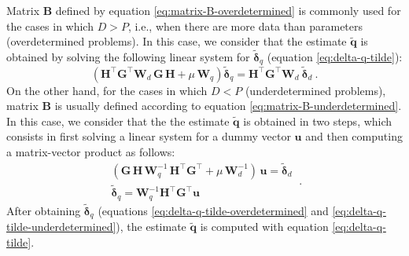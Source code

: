 Matrix $\mathbf{B}$ defined by equation \ref{eq:matrix-B-overdetermined} is commonly used for the cases in which $D > P$, i.e., when
there are more data than parameters (overdetermined problems).
In this case, we consider that the estimate $\tilde{\mathbf{q}}$ is obtained by solving the following linear system
for $\tilde{\boldsymbol{\delta}}_{q}$ (equation \ref{eq:delta-q-tilde}):
\begin{equation}
	\left( \mathbf{H}^{\top} \mathbf{G}^{\top} \mathbf{W}_{d} \, \mathbf{G} \, \mathbf{H} + 
	\mu \, \mathbf{W}_{q} \right) 
	\tilde{\boldsymbol{\delta}}_{q} = 
	\mathbf{H}^{\top} \mathbf{G}^{\top} \mathbf{W}_{d} \: 
	\tilde{\boldsymbol{\delta}}_{d} \: .
	\label{eq:delta-q-tilde-overdetermined}
\end{equation}
On the other hand, for the cases in which $D < P$ (underdetermined problems), matrix $\mathbf{B}$ is 
usually defined according to equation \ref{eq:matrix-B-underdetermined}. In this case, we consider that the 
the estimate $\tilde{\mathbf{q}}$ is obtained in two steps, which consists in first solving a linear system 
for a dummy vector $\mathbf{u}$ and then computing a matrix-vector product as follows:
\begin{equation}
	\begin{split}
		\left( \mathbf{G} \, \mathbf{H} \, \mathbf{W}_{q}^{-1} \,
		\mathbf{H}^{\top}\mathbf{G}^{\top} + \mu \, \mathbf{W}_{d}^{-1} \right) \,  
		\mathbf{u} = \tilde{\boldsymbol{\delta}}_{d} \\
		\tilde{\boldsymbol{\delta}}_{q} = \mathbf{W}_{q}^{-1}
		\mathbf{H}^{\top} \mathbf{G}^{\top} \mathbf{u}
	\end{split} \: .
	\label{eq:delta-q-tilde-underdetermined}
\end{equation}
After obtaining $\tilde{\boldsymbol{\delta}}_{q}$ (equations \ref{eq:delta-q-tilde-overdetermined} and \ref{eq:delta-q-tilde-underdetermined}),
the estimate $\tilde{\mathbf{q}}$ is computed with equation \ref{eq:delta-q-tilde}.

